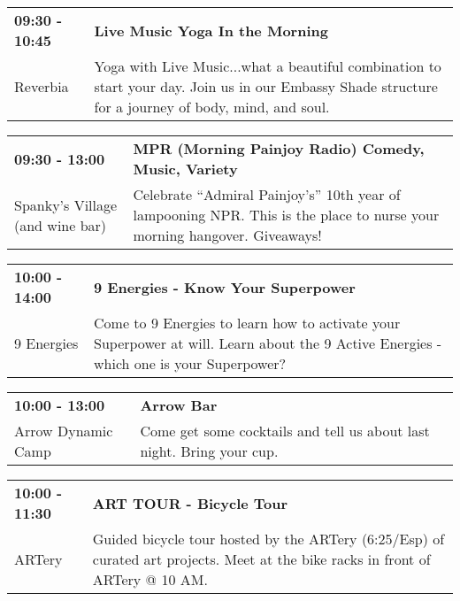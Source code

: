\begin{tabular}{ p{1in} p{2.2in} }
    \textbf{09:30 - 10:45} & \textbf{Live Music Yoga In the Morning } \\
    Reverbia \newline  & Yoga with Live Music...what a beautiful combination to start your day. Join us in our Embassy Shade structure for a journey of body, mind, and soul. \\
    \hline 
\end{tabular}
    
\begin{tabular}{ p{1in} p{2.2in} }
    \textbf{09:30 - 13:00} & \textbf{MPR (Morning Painjoy Radio) Comedy, Music, Variety} \\
    Spanky's Village (and wine bar) \newline  & Celebrate ``Admiral Painjoy's'' 10th year of lampooning NPR.  This is the place to nurse your morning hangover.  Giveaways! \\
    \hline 
\end{tabular}
    
\begin{tabular}{ p{1in} p{2.2in} }
    \textbf{10:00 - 14:00} & \textbf{9 Energies - Know Your Superpower} \\
    9 Energies \newline  & Come to 9 Energies to learn how to activate your Superpower at will. Learn about the 9 Active Energies - which one is your Superpower? \\
    \hline 
\end{tabular}
    
\begin{tabular}{ p{1in} p{2.2in} }
    \textbf{10:00 - 13:00} & \textbf{Arrow Bar} \\
    Arrow Dynamic Camp \newline  & Come get some cocktails and tell us about last night. Bring your cup. \\
    \hline 
\end{tabular}
    
\begin{tabular}{ p{1in} p{2.2in} }
    \textbf{10:00 - 11:30} & \textbf{ART TOUR - Bicycle Tour} \\
    ARTery \newline  & Guided bicycle tour hosted by the ARTery (6:25/Esp) of curated art projects.   Meet at the bike racks in front of ARTery @ 10 AM. \\
    \hline 
\end{tabular}
    
